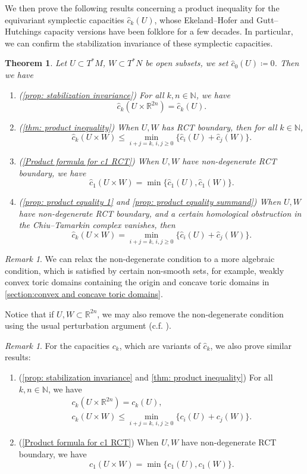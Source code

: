 \documentclass[11pt]{amsart}
\numberwithin{equation}{section}
\theoremstyle{plain}
\newtheorem{Thm}{Theorem}[section]
\theoremstyle{definition}
\theoremstyle{remark}
\newtheorem{RMK}[rmk]{Remark}
\newcommand{\bR} { {\mathbb{R}}}
\newcommand{\bN} { {\mathbb{N}}}
\begin{document}
We then prove the following results concerning a product inequality for the equivariant symplectic capacities $\widehat{c}_k(U)$, whose Ekeland--Hofer and Gutt--Hutchings capacity versions have been folklore for a few decades. In particular, we can confirm the stabilization invariance of these symplectic capacities. 

\begin{Thm}\label{thm: product inequality intro}
    Let $U \subset T^*M$, $W \subset T^*N$ be open subsets, we set $\widehat c_0(U) \coloneqq 0$. Then we have
\begin{enumerate}[fullwidth]
    \item (\autoref{prop: stabilization invariance}) For all $k, n \in \bN$, we have \[\widehat{c}_k(U \times \mathbb{R}^{2n}) = \widehat{c}_k(U).\]
    \item (\autoref{thm: product inequality}) When $U,W$ has RCT boundary, then for all $k\in \bN$,
    \[\widehat{c}_k(U \times W) \leq \min_{i+j=k,\,i,j\geq 0}\{\widehat{c}_i(U) + \widehat{c}_j(W)\}.\] 
    \item (\autoref{Product formula for c1 RCT}) When $U,W$ have non-degenerate RCT boundary, we have
    \[\widehat{c}_1(U \times W) = \min\{\widehat{c}_1(U), \widehat{c}_1(W)\}.\]
    \item (\autoref{prop: product equality 1} and \autoref{prop: product equality summand}) When $U, W$ have non-degenerate RCT boundary, and a certain homological obstruction in the Chiu--Tamarkin complex vanishes, then 
    \[\widehat{c}_k(U \times W) = \min_{i+j=k,\,i,j\geq 0}\{\widehat{c}_i(U) + \widehat{c}_j(W)\}.\] 
\end{enumerate}
\end{Thm}
\begin{RMK}We can relax the non-degenerate condition to a more algebraic condition, which is satisfied by certain non-smooth sets, for example, weakly convex toric domains containing the origin and concave toric domains in \autoref{section:convex and concave toric domains}.

Notice that if $U,W\subset \bR^{2n}$, we may also remove the non-degenerate condition using the usual perturbation argument (c.f. \cite[Proposition 3]{EkelandHoferII}).
\end{RMK}

\begin{RMK}
For the capacities $c_k$, which are variants of $\widehat{c}_k$, we also prove similar results:
\begin{enumerate}[fullwidth]
    \item (\autoref{prop: stabilization invariance} and \autoref{thm: product inequality}) For all $k, n \in \bN$, we have
    \begin{gather*}
    {c}_k(U \times \mathbb{R}^{2n}) = {c}_k(U),\\
    {c}_k(U \times W) \leq \min_{i+j=k,\,i,j\geq 0}\{{c}_i(U) + {c}_j(W)\}.
    \end{gather*}
    \item (\autoref{Product formula for c1 RCT}) When $U, W$ have non-degenerate RCT boundary, we have
    \[{c}_1(U \times W) = \min\{{c}_1(U), {c}_1(W)\}.\]
\end{enumerate}
\end{RMK}
\end{document}
